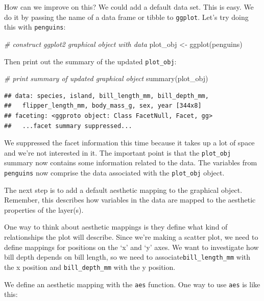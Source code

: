 \documentclass[
]{book}
\newenvironment{Shaded}{\begin{snugshade}}{\end{snugshade}}
\newcommand{\CommentTok}[1]{\textcolor[rgb]{0.56,0.35,0.01}{\textit{#1}}}
\newcommand{\FunctionTok}[1]{\textcolor[rgb]{0.00,0.00,0.00}{#1}}
\newcommand{\NormalTok}[1]{#1}
\newcommand{\OtherTok}[1]{\textcolor[rgb]{0.56,0.35,0.01}{#1}}
\begin{document}
How can we improve on this? We could add a default data set. This is easy. We do it by passing the name of a data frame or tibble to \texttt{ggplot}. Let's try doing this with \texttt{penguins}:

\begin{Shaded}
\begin{Highlighting}[]
\CommentTok{\# construct ggplot2 graphical object with data}
\NormalTok{plot\_obj }\OtherTok{\textless{}{-}} \FunctionTok{ggplot}\NormalTok{(penguins)}
\end{Highlighting}
\end{Shaded}

Then print out the summary of the updated \texttt{plot\_obj}:

\begin{Shaded}
\begin{Highlighting}[]
\CommentTok{\# print summary of updated graphical object}
\FunctionTok{summary}\NormalTok{(plot\_obj)}
\end{Highlighting}
\end{Shaded}

\begin{verbatim}
## data: species, island, bill_length_mm, bill_depth_mm,
##   flipper_length_mm, body_mass_g, sex, year [344x8]
## faceting: <ggproto object: Class FacetNull, Facet, gg>
##   ...facet summary suppressed...
\end{verbatim}

We suppressed the facet information this time because it takes up a lot of space and we're not interested in it. The important point is that the \texttt{plot\_obj} summary now contains some information related to the data. The variables from \texttt{penguins} now comprise the data associated with the \texttt{plot\_obj} object.

The next step is to add a default aesthetic mapping to the graphical object. Remember, this describes how variables in the data are mapped to the aesthetic properties of the layer(s).

One way to think about aesthetic mappings is they define what kind of relationships the plot will describe. Since we're making a scatter plot, we need to define mappings for positions on the `x' and `y' axes. We want to investigate how bill depth depends on bill length, so we need to associate\texttt{bill\_length\_mm} with the x position and \texttt{bill\_depth\_mm} with the y position.

We define an aesthetic mapping with the \texttt{aes} function. One way to use \texttt{aes} is like this:
\end{document}
